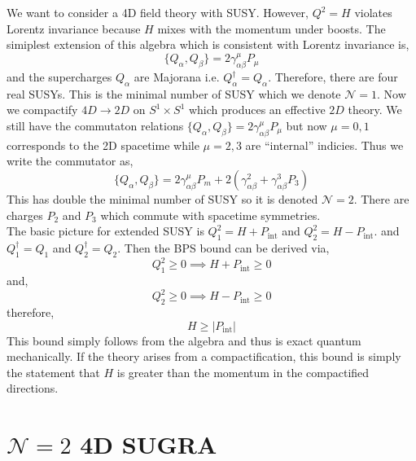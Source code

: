 \documentclass[12pt]{extarticle}
\begin{document}
We want to consider a 4D field theory with SUSY. However, $Q^2 = H$ violates Lorentz invariance because $H$ mixes with the momentum under boosts. The simiplest extension of this algebra which is consistent with Lorentz invariance is,
\[ \{ Q_\alpha, Q_\beta \} = 2 \gamma_{\alpha \beta}^\mu P_\mu \]
and the supercharges $Q_\alpha$ are Majorana i.e. $Q_\alpha^\dagger = Q_\alpha$. Therefore, there are four real SUSYs. This is the minimal number of SUSY which we denote $\mathcal{N} = 1$. Now we compactify $4D \to 2D$ on $S^1 \times S^1$ which produces an effective $2D$ theory. We still have the commutaton relations $\{ Q_\alpha, Q_\beta \} = 2 \gamma^\mu_{\alpha \beta} P_\mu$ but now $\mu = 0,1$ corresponds to the 2D spacetime while $\mu = 2,3$ are ``internal'' indicies. Thus we write the commutator as,
\[ \{ Q_\alpha, Q_\beta \} = 2 \gamma^\mu_{\alpha \beta} P_m + 2 (\gamma^2_{\alpha \beta} + \gamma^3_{\alpha \beta} P_3) \]
This has double the minimal number of SUSY so it is denoted $\mathcal{N} = 2$. There are charges $P_2$ and $P_3$ which commute with spacetime symmetries. 
\bigskip\\
The basic picture for extended SUSY is $Q_1^2 = H + P_{\text{int}}$ and $Q_2^2 = H - P_{\text{int}}$. 
and $Q_1^\dagger = Q_1$ and $Q_2^\dagger = Q_2$. 
Then the BPS bound can be derived via,
\[ Q_1^2 \ge 0 \implies H + P_{\text{int}} \ge 0 \]
and,
\[ Q_2^2 \ge 0 \implies H - P_{\text{int}} \ge 0 \]
therefore,
\[ H \ge |P_{\text{int}}| \]
This bound simply follows from the algebra and thus is exact quantum mechanically.
If the theory arises from a compactification, this bound is simply the statement that $H$ is greater than the momentum in the compactified directions.  

\section{$\mathcal{N} = 2$ 4D SUGRA}
\end{document}
